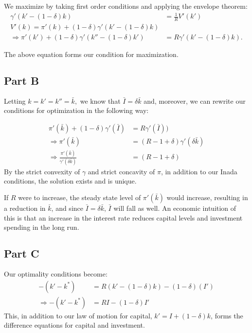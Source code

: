 \documentclass[11pt]{article} %
\begin{document}
We maximize by taking first order conditions and applying the envelope theorem:
\begin{align*}
\gamma' (k' - (1-\delta)k) &= \frac{1}{R} V'(k')\\%
V'(k) = \pi'(k) + (1-\delta) \gamma ' (k' - (1-\delta)k)\\
\Rightarrow \pi '(k') + (1-\delta) \gamma ' (k'' - (1-\delta)k')&= R \gamma'(k' - (1-\delta)k).
\end{align*}

The above equation forms our condition for maximization.

\subsection{Part B}
Letting $k = k' = k'' = \bar{k},$ we know that $\bar{I} = \delta \bar{k}$ and, moreover, we can rewrite our conditions for optimization in the following way:

\begin{align*}
\pi '(\bar{k}) + (1-\delta) \gamma '(\bar{I}) &= R \gamma'(\bar{I}))\\
\Rightarrow \pi'(\bar{k}) &= (R-1 + \delta)\gamma'(\delta \bar{k})\\
\Rightarrow \frac{ \pi'(\bar{k})}{\gamma'(\delta \bar{k})} &= (R-1+ \delta)
\end{align*}
 By the strict convexity of $\gamma$ and strict concavity of $\pi$, in addition to our Inada conditions, the solution exists and is unique.

If $R$ were to increase, the steady state level of $\pi'(\bar{k})$ would increase, resulting in a reduction in $\bar{k}$, and since $\bar{I} = \delta \bar{k}$, $\bar{I}$ will fall as well. An economic intuition of this is that an increase in the interest rate reduces capital levels and investment spending in the long run.

\subsection{Part C}
Our optimality conditions become:
\begin{align*}
-(k'-k^{*}) &= R(k' - (1-\delta)k) - (1-\delta)(I')\\
\Rightarrow -(k'-k^{*}) &= RI -(1-\delta)I'
\end{align*}
This, in addition to our law of motion for capital, $k' = I + (1-\delta)k$, forms the difference equations for capital and investment.
\end{document}
